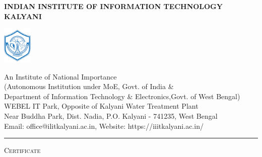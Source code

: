 \cleardoublepage
\thispagestyle{empty}
\begin{center}
    {\bf\uppercase{Indian Institute of Information Technology Kalyani}}\\
    \vspace{-0.3cm}
\end{center}
\begin{multicols}{2}
    \flushleft
    \vspace{-2cm}
    \includegraphics[width=14mm]{Figure/header/IIITK.png}
    \columnbreak
    \par
    \begin{center}
        \hspace{-75mm} {\large An Institute of National Importance \vspace{0.15cm}}\\
        \hspace{-73mm} \textmd{(Autonomous Institution under MoE, Govt. of India \& \vspace{0.15cm}} \\
        \hspace{-66mm}\textmd{Department of Information Technology \& Electronics,Govt. of West Bengal)}\\
        \hspace{-73mm}\textmd{WEBEL IT Park, Opposite of Kalyani Water Treatment Plant \vspace{0.1cm}}\\
        \hspace{-71mm} \textmd{Near Buddha Park, Dist. Nadia, P.O. Kalyani - 741235, West Bengal \vspace{0.1cm}}\\
        \hspace{-73mm} \textmd{Email: office@ilitkalyani.ac.in, Website: https://iiitkalyani.ac.in/}
    \end{center}
\end{multicols}
\vspace{-1cm}
\begin{center}
    \rule{\textwidth}{0.04cm}
\end{center}
\vspace{0.5cm}
\begin{center}
    {\LARGE \textsc{Certificate}}
\end{center}

